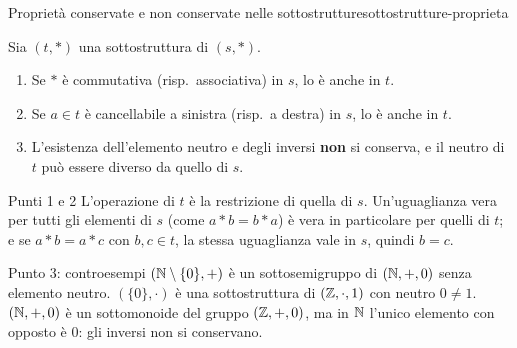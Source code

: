 \begin{concetto}
\begin{Proposizione}{Proprietà conservate e non conservate nelle sottostrutture}{sottostrutture-proprieta}
    \begin{prerequisiti}
    \end{prerequisiti}
    Sia $(t, *)$ una sottostruttura di $(s, *)$.
    \begin{enumerate}
        \item Se $*$ è commutativa (risp.\ associativa) in $s$, lo è anche in $t$.
        \item Se $a \in t$ è cancellabile a sinistra (risp.\ a destra) in $s$, lo è anche in $t$.
        \item L'esistenza dell'elemento neutro e degli inversi \textbf{non} si conserva, e il neutro di $t$ può essere diverso da quello di $s$.
    \end{enumerate}
\end{Proposizione}
\begin{dimostrazione}
    \begin{caso}{Punti 1 e 2}
        L'operazione di $t$ è la restrizione di quella di $s$. Un'uguaglianza vera per tutti gli elementi di $s$ (come $a * b = b * a$) è vera in particolare per
        quelli di $t$; e se $a * b = a * c$ con $b, c \in t$, la stessa uguaglianza vale in $s$, quindi $b = c$.
    \end{caso}
    \begin{caso}{Punto 3: controesempi}
        $(\mathbb{N} \setminus \{0\}, +)$ è un sottosemigruppo di $(\mathbb{N}, +, 0)$ senza elemento neutro. $(\{0\}, \cdot)$ è una sottostruttura di $(\mathbb{Z}, \cdot, 1)$ con neutro
        $0 \neq 1$. $(\mathbb{N}, +, 0)$ è un sottomonoide del gruppo $(\mathbb{Z}, +, 0)$, ma in $\mathbb{N}$ l'unico elemento con opposto è $0$: gli inversi non si conservano.
    \end{caso}
\end{dimostrazione}
\end{concetto}


